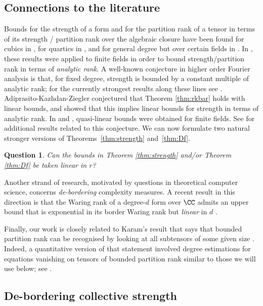 \documentclass{amsart}
\newtheorem{question}[thm]{Question}
\begin{document}
\subsection{Connections to the literature}

Bounds for the strength of a form and for the partition rank of a
tensor in terms of its strength / partition rank over the algebraic
closure have been found for cubics in \cite{Adiprasito21}, for quartics
in \cite{Kazhdan23}, and for general degree but over certain fields
in \cite{Lampert22,Baily24}. In \cite{Adiprasito21}, these results
were applied to finite fields in order to bound strength/partition
rank in terms of \emph{analytic rank}. A well-known conjecture in
higher order Fourier analysis is that, for fixed degree, strength is
bounded by a constant multiple of analytic rank; for the currently
strongest results along these lines see \cite{Cohen21,Moshkovitz22}.
Adiprasito-Kazhdan-Ziegler conjectured \cite{Adiprasito21} that
Theorem \ref{thm:rkbar} holds with linear bounds, and showed that
this implies linear bounds for strength in terms of analytic rank. In
\cite{Moshkovitz22} and \cite{Baily24}, quasi-linear bounds were obtained
for finite fields. See \cite{Chen24} for additional results related to
this conjecture. We can now formulate two natural stronger versions of
Theorems~\ref{thm:strength} and~\ref{thm:Df}.

\begin{question}\label{q:lin-bounds}
    Can the bounds in Theorem \ref{thm:strength} and/or Theorem \ref{thm:Df} be taken linear in $r$?
\end{question}

Another strand of research, motivated by questions in theoretical computer
science, concerns {\em de-bordering} complexity
measures. A recent result in this direction is that the Waring rank of
a degree-$d$ form over $\CC$ admits an upper bound that is exponential
in its border Waring rank but {\em linear} in $d$ \cite{Dutta22}. 

Finally, our work is closely related to Karam's result that says that
bounded partition rank can be recognised by looking at all subtensors
of some given size \cite{Karam22}. Indeed, a quantitative version of
that statement involved degree estimations for equations vanishing on
tensors of bounded partition rank similar to those we will use below;
see \cite{Draisma23a}.

\subsection{De-bordering collective strength}
\end{document}
